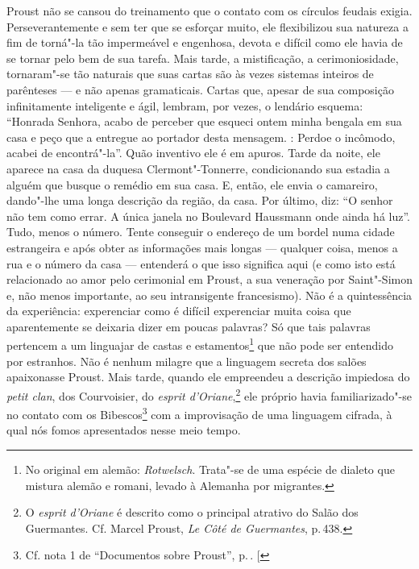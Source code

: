 Proust não se cansou do treinamento que o contato com os círculos
feudais exigia. Perseverantemente e sem ter que se esforçar muito, ele
flexibilizou sua natureza a fim de torná"-la tão impermeável e engenhosa,
devota e difícil como ele havia de se tornar pelo bem de sua tarefa.
Mais tarde, a mistificação, a cerimoniosidade, tornaram"-se tão
naturais que suas cartas são às vezes sistemas inteiros de parênteses ---
e não apenas gramaticais. Cartas que, apesar de sua composição
infinitamente inteligente e ágil, lembram, por vezes, o lendário
esquema: ``Honrada Senhora, acabo de perceber que esqueci ontem minha
bengala em sua casa e peço que a entregue ao portador desta mensagem.
: Perdoe o incômodo, acabei de encontrá"-la''. Quão inventivo ele é
em apuros. Tarde da noite, ele aparece na casa da duquesa
Clermont"-Tonnerre, condicionando sua estadia a alguém que busque o
remédio em sua casa. E, então, ele envia o camareiro, dando"-lhe uma
longa descrição da região, da casa. Por último, diz: ``O senhor não tem
como errar. A única janela no Boulevard Haussmann onde ainda há luz''.
Tudo, menos o número. Tente conseguir o endereço de um bordel numa
cidade estrangeira e após obter as informações mais longas --- qualquer
coisa, menos a rua e o número da casa --- entenderá o que isso significa
aqui (e como isto está relacionado ao amor pelo cerimonial em Proust, a
sua veneração por Saint"-Simon e, não menos importante, ao seu
intransigente francesismo). Não é a quintessência da experiência:
experenciar como é difícil experenciar muita coisa que aparentemente
se deixaria dizer em poucas palavras? Só que tais palavras pertencem a
um linguajar de castas e estamentos\footnote{No original em alemão:
  \emph{Rotwelsch}. Trata"-se de uma espécie de dialeto que mistura
  alemão e romani, levado à Alemanha por migrantes. \versal{[N.~T.]}} que não pode ser
entendido por estranhos. Não é nenhum milagre que a linguagem secreta
dos salões apaixonasse Proust. Mais tarde, quando ele empreendeu a
descrição impiedosa do \emph{petit clan}, dos Courvoisier, do
\emph{esprit d'Oriane},\footnote{O \emph{esprit d'Oriane} é descrito como o principal
  atrativo do Salão dos Guermantes. Cf. Marcel Proust, \textit{Le Côté de Guermantes}, p.\,438. \versal{[N.~O.]}} ele próprio havia familiarizado"-se
no contato com os Bibescos\footnote{Cf. nota 1 de ``Documentos sobre Proust'', p.\,\pageref{bibescos}. {[}\versal{N.~O.}{]}} com a improvisação de uma linguagem cifrada,
à qual nós fomos apresentados nesse meio tempo.


